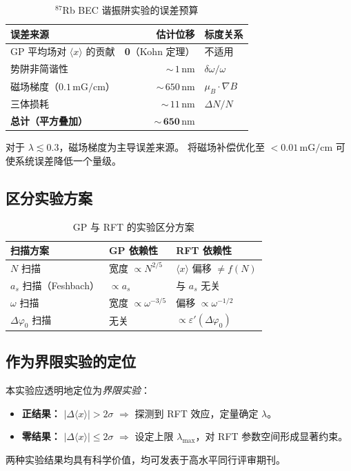 \documentclass[a4paper,11pt]{article}
\begin{document}
\begin{table}[h]
\centering
\caption{$^{87}$Rb BEC 谐振阱实验的误差预算}
\begin{tabular}{lrl}
\toprule
误差来源 & 估计位移 & 标度关系 \\
\midrule
GP 平均场对 $\langle x\rangle$ 的贡献 & \textbf{0}（Kohn 定理） & 不适用 \\
势阱非简谐性 & ${\sim}\,1\,\mathrm{nm}$ & $\delta\omega/\omega$ \\
磁场梯度（$0{.}1\,\mathrm{mG/cm}$） & ${\sim}\,650\,\mathrm{nm}$ & $\mu_B \cdot \nabla B$ \\
三体损耗 & ${\sim}\,11\,\mathrm{nm}$ & $\Delta N / N$ \\
\midrule
\textbf{总计（平方叠加）} & $\mathbf{{\sim}\,650\,\mathrm{nm}}$ & \\
\bottomrule
\end{tabular}
\end{table}

对于 $\lambda \lesssim 0{.}3$，磁场梯度为主导误差来源。
将磁场补偿优化至 $< 0{.}01\,\mathrm{mG/cm}$ 可使系统误差降低一个量级。

\subsection{区分实验方案}

\begin{table}[h]
\centering
\caption{GP 与 RFT 的实验区分方案}
\begin{tabular}{lll}
\toprule
扫描方案 & GP 依赖性 & RFT 依赖性 \\
\midrule
$N$ 扫描 & 宽度 $\propto N^{2/5}$ & $\langle x\rangle$ 偏移 $\neq f(N)$ \\
$a_s$ 扫描（Feshbach） & $\propto a_s$ & 与 $a_s$ 无关 \\
$\omega$ 扫描 & 宽度 $\propto \omega^{-3/5}$ & 偏移 $\propto \omega^{-1/2}$ \\
$\Delta\varphi_0$ 扫描 & 无关 & $\propto \varepsilon'(\Delta\varphi_0)$ \\
\bottomrule
\end{tabular}
\end{table}

\subsection{作为界限实验的定位}

本实验应透明地定位为\emph{界限实验}：
\begin{itemize}
  \item \textbf{正结果：} $|\Delta\langle x\rangle| > 2\sigma$
    $\Rightarrow$ 探测到 RFT 效应，定量确定 $\lambda$。
  \item \textbf{零结果：} $|\Delta\langle x\rangle| \leq 2\sigma$
    $\Rightarrow$ 设定上限 $\lambda_{\max}$，对 RFT 参数空间形成显著约束。
\end{itemize}
两种实验结果均具有科学价值，均可发表于高水平同行评审期刊。
\end{document}

